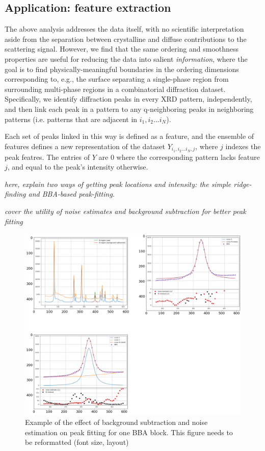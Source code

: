 \documentclass[12pt]{iopart}
\begin{document}
\subsection{Application: feature extraction}
The above analysis addresses the data itself, with no scientific
interpretation aside from the separation between crystalline and diffuse
contributions to the scattering signal. However, we find that the same
ordering and smoothness properties are useful for reducing the data into
salient \emph{information}, where the goal is to find physically-meaningful
boundaries in the ordering dimensions corresponding to, e.g., the
surface separating a single-phase region from surrounding multi-phase
regions in a combinatorial diffraction dataset. Specifically, we 
identify diffraction peaks in every XRD pattern, independently, and then
link each peak in a pattern to any q-neighboring peaks in neighboring patterns (i.e. patterns that are adjacent in $i_1, i_2 ... i_N$). 

Each set of peaks linked in this way is defined as a feature, and the ensemble of features defines a new representation of the dataset $ Y_{i_1,i_2...i_N, j} $, where $j$ indexes the peak featres. The entries of $Y$ are 0 where the corresponding pattern lacks feature $j$, and equal to the peak's intensity otherwise.

\emph{here, explain two ways of getting peak locations and intensity: the simple ridge-finding and BBA-based peak-fitting.}

\emph{cover the utility of noise estimates and background subtraction for better peak fitting}

\begin{figure}
  \includegraphics[width=\linewidth]{paper_figures/pkg/3_BBA.png}
  \caption{Example of the effect of background subtraction and noise
 estimation on peak fitting for one BBA block. This figure needs to be
 reformatted (font size, layout)}
  \label{fig:features}
\end{figure}
\end{document}
